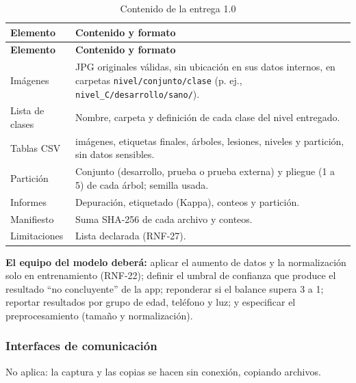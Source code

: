 \documentclass[11pt]{article}
\begin{document}
{\small
\begin{longtable}{|>{\RaggedRight\arraybackslash}p{3.32cm}|>{\RaggedRight\arraybackslash}p{11.53cm}|}
\caption{Contenido de la entrega 1.0}\\
\hline
\rowcolor{encabezado}\textbf{Elemento} & \textbf{Contenido y formato} \\ \hline
\endfirsthead
\hline
\rowcolor{encabezado}\textbf{Elemento} & \textbf{Contenido y formato} \\ \hline
\endhead
Imágenes & JPG originales válidas, sin ubicación en sus datos internos, en carpetas \nolinkurl{nivel/conjunto/clase} (p. ej., \nolinkurl{nivel_C/desarrollo/sano/}). \\ \hline
Lista de clases & Nombre, carpeta y definición de cada clase del nivel entregado. \\ \hline
Tablas CSV & imágenes, etiquetas finales, árboles, lesiones, niveles y partición, sin datos sensibles. \\ \hline
Partición & Conjunto (desarrollo, prueba o prueba externa) y pliegue (1 a 5) de cada árbol; semilla usada. \\ \hline
Informes & Depuración, etiquetado (Kappa), conteos y partición. \\ \hline
Manifiesto & Suma SHA-256 de cada archivo y conteos. \\ \hline
Limitaciones & Lista declarada (RNF-27). \\ \hline
\end{longtable}}
\textbf{El equipo del modelo deberá:} aplicar el aumento de datos y la normalización solo en entrenamiento (RNF-22); definir el umbral de confianza que produce el resultado “no concluyente” de la app; reponderar si el balance supera 3 a 1; reportar resultados por grupo de edad, teléfono y luz; y especificar el preprocesamiento (tamaño y normalización).

\subsubsection{Interfaces de comunicación}
No aplica: la captura y las copias se hacen sin conexión, copiando archivos.
\end{document}
